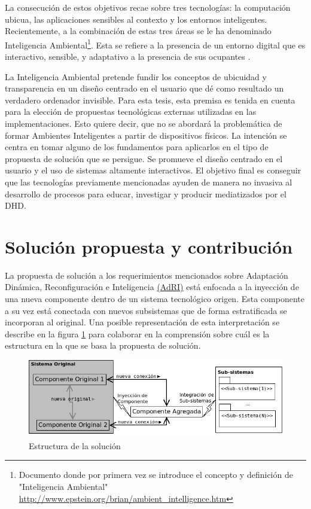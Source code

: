 La consecución de estos objetivos recae sobre tres tecnologías: la computación
ubicua, las aplicaciones sensibles al contexto y los entornos inteligentes.
Recientemente, a la combinación de estas tres áreas se le ha denominado
Inteligencia 
Ambiental\footnote{
Documento donde por primera vez se introduce el concepto y definición de
"Inteligencia
Ambiental"  \url{http://www.epstein.org/brian/ambient_intelligence.htm}}. Esta
se refiere a la presencia de un entorno digital
que es interactivo, sensible, y adaptativo a la presencia de sus ocupantes
\cite{cap1.16}.

La Inteligencia Ambiental pretende fundir los conceptos de ubicuidad y
transparencia en un diseño centrado en el usuario que dé como resultado un
verdadero ordenador invisible. Para esta tesis, esta premisa es tenida en
cuenta para la elección de propuestas tecnológicas externas utilizadas en las
implementaciones. Esto quiere decir, que no se abordará la problemática de
formar Ambientes Inteligentes a partir de dispositivos físicos. La intención se
centra en tomar alguno de los fundamentos para aplicarlos en el tipo de
propuesta de solución que se persigue. Se promueve el diseño centrado en el
usuario y el uso de sistemas altamente interactivos. El objetivo
final es conseguir que las tecnologías previamente mencionadas ayuden de
manera no invasiva al desarrollo de procesos para educar, investigar y producir
mediatizados por el DHD.

\section{Solución propuesta y contribución}

La propuesta de solución a los requerimientos mencionados sobre
Adaptación Dinámica, Reconfiguración e Inteligencia \hyperref[AdRI]{(AdRI)} 
está enfocada a la
inyección de una nueva componente dentro de un sistema tecnológico origen. Esta
componente a su vez está conectada con nuevos subsistemas que de forma
estratificada se incorporan al original. Una posible representación de
esta interpretación se describe en la figura \ref{fig:solucion} para colaborar
en la comprensión sobre cuál es la estructura en la que se basa la propuesta de
solución.


\begin{figure}[h]
\begin{center}
 \includegraphics[width=4 in,totalheight=3 in] {Ch0/solucion}
\caption{Estructura de la solución} \label{fig:solucion}
\end{center}
\end{figure}

